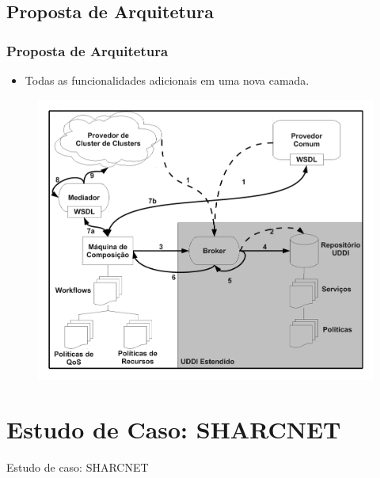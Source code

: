 \documentclass[red, cover=invisible, theme=Warsaw]{myslides}
\begin{document}
    \subsection{Proposta de Arquitetura}
	\begin{frame} \frametitle{Proposta de Arquitetura}
	    \begin{itemize}
		\item Todas as funcionalidades adicionais em uma nova camada.
	    \end{itemize}
	    \begin{center}
		\begin{figure}
		\includegraphics[scale=0.24]{imagens/execComposicaoG.pdf}		
		\end{figure}
	    \end{center}
	\end{frame}
    
    
\section{Estudo de Caso: SHARCNET}
    \begin{frame}
	\begin{center}
	{\Huge Estudo de caso: SHARCNET}
	\end{center}
    \end{frame}
\end{document}
